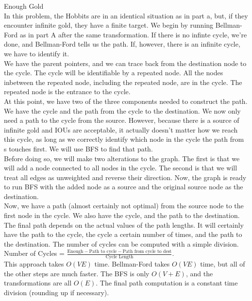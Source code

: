 \documentclass[12pt,twoside]{article}
\begin{document}
\begin{problems}
\begin{problemparts}
\problempart Enough Gold\\
In this problem, the Hobbits are in an identical situation as in part a, but, if they encounter infinite gold, they have a finite target.  We begin by running Bellman-Ford as in part A after the same transformation.  If there is no infinte cycle, we're done, and Bellman-Ford tells us the path.  If, however, there is an infinite cycle, we have to identify it.\\

We have the parent pointers, and we can trace back from the destination node to the cycle.  The cycle will be identifiable by a repeated node.  All the nodes inbetween the repeated node, including the repeated node, are in the cycle.  The repeated node is the entrance to the cycle.\\

At this point, we have two of the three components needed to construct the path.  We have the cycle and the path from the cycle to the destination.  We now only need a path to the cycle from the source.  However, because there is a source of infinite gold and IOUs are acceptable, it actually doesn't matter how we reach this cycle, as long as we correctly identify which node in the cycle the path from s touches first.  We will use BFS to find that path.\\

Before doing so, we will make two alterations to the graph.  The first is that we will add a node connected to all nodes in the cycle.  The second is that we will treat all edges as unweighted and reverse their direction.  Now, the graph is ready to run BFS with the added node as a source and the original source node as the destination. \\

Now, we have a path (almost certainly not optimal) from the source node to the first node in the cycle.  We also have the cycle, and the path to the destination.  The final path depends on the actual values of the path lengths.  It will certainly have the path to the cycle, the cycle a certain number of times, and the path to the destination.  The number of cycles can be computed with a simple division.  Number of Cycles = $\frac{\text{Enough} - \text{Path to cycle} - \text{Path from cycle to dest} }{\text{Cycle Length}}$.\\

This approach takes $O(VE)$ time.  Bellman-Ford takes $O(VE)$ time, but all of the other steps are much faster.  The BFS is only $O(V+E)$, and the transformations are all $O(E)$.  The final path computation is a constant time division (rounding up if necessary).
\end{problemparts}
\end{problems}
\end{document}
